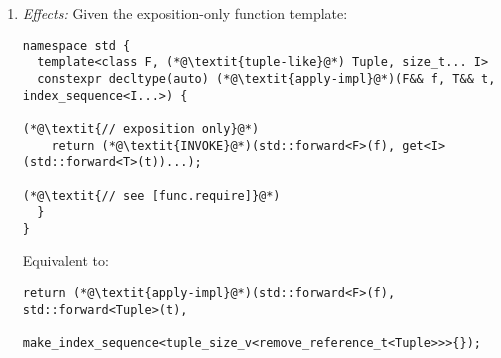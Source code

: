 \documentclass{article}
\begin{document}
\begin{enumerate}
\item \textit{Effects:} Given the exposition-only function template:

\begin{lstlisting}[style=base]
namespace std {
  template<class F, (*@\textit{tuple-like}@*) Tuple, size_t... I>
  constexpr decltype(auto) (*@\textit{apply-impl}@*)(F&& f, T&& t, index_sequence<I...>) {
                                                                  (*@\textit{// exposition only}@*)
    return (*@\textit{INVOKE}@*)(std::forward<F>(f), get<I>(std::forward<T>(t))...);
                                                                  (*@\textit{// see [func.require]}@*)
  }
}
\end{lstlisting}

Equivalent to:

\begin{lstlisting}[style=base]
  return (*@\textit{apply-impl}@*)(std::forward<F>(f), std::forward<Tuple>(t),
                  make_index_sequence<tuple_size_v<remove_reference_t<Tuple>>>{});
\end{lstlisting}

\end{enumerate}
\end{document}
